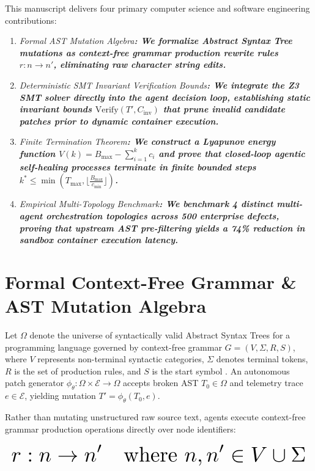 \documentclass[10pt,twocolumn,letterpaper]{article}
\begin{document}
This manuscript delivers four primary computer science and software engineering contributions:
\begin{enumerate}
  \item \textit{Formal AST Mutation Algebra\textbf{: We formalize Abstract Syntax Tree mutations as context-free grammar production rewrite rules $r : n \to n'$, eliminating raw character string edits.}}
  \item \textit{Deterministic SMT Invariant Verification Bounds\textbf{: We integrate the Z3 SMT solver directly into the agent decision loop, establishing static invariant bounds $\text{Verify}(T', C_{\text{inv}})$ that prune invalid candidate patches prior to dynamic container execution.}}
  \item \textit{Finite Termination Theorem\textbf{: We construct a Lyapunov energy function $V(k) = B_{\text{max}} - \sum_{i=1}^k c_i$ and prove that closed-loop agentic self-healing processes terminate in finite bounded steps $k^* \le \min\left(T_{\text{max}}, \lfloor \frac{B_{\text{max}}}{c_{\text{min}}} \rfloor\right)$.}}
  \item \textit{Empirical Multi-Topology Benchmark\textbf{: We benchmark 4 distinct multi-agent orchestration topologies across 500 enterprise defects, proving that upstream AST pre-filtering yields a 74\% reduction in sandbox container execution latency.}}
\end{enumerate}



\section{Formal Context-Free Grammar \& AST Mutation Algebra}


Let $\Omega$ denote the universe of syntactically valid Abstract Syntax Trees for a programming language governed by context-free grammar $G = (V, \Sigma, R, S)$, where $V$ represents non-terminal syntactic categories, $\Sigma$ denotes terminal tokens, $R$ is the set of production rules, and $S$ is the start symbol \cite{bratman1987}. An autonomous patch generator $\phi_\theta : \Omega \times \mathcal{E} \to \Omega$ accepts broken AST $T_0 \in \Omega$ and telemetry trace $e \in \mathcal{E}$, yielding mutation $T' = \phi_\theta(T_0, e)$.

Rather than mutating unstructured raw source text, agents execute context-free grammar production operations directly over node identifiers:

\begin{equation}
\resizebox{\columnwidth}{!}{$\displaystyle
\begin{aligned}
r : n \to n' \quad \text{where } n, n' \in V \cup \Sigma
\end{aligned}
$}
\end{equation}
\end{document}
